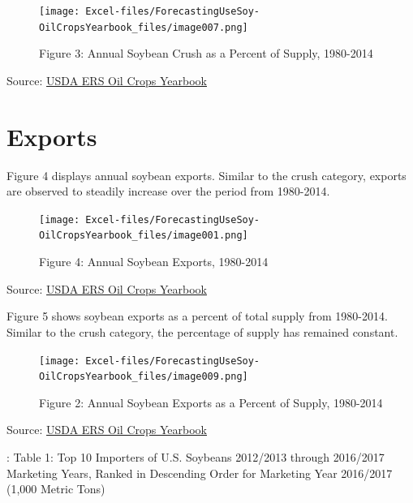 \documentclass[
]{book}
\begin{document}
\begin{figure}
\centering
\texttt{[image: Excel-files/ForecastingUseSoy-OilCropsYearbook\_files/image007.png]}
\caption{Figure 3: Annual Soybean Crush as a Percent of Supply, 1980-2014}
\end{figure}

Source: \href{http://www.ers.usda.gov/data-products/oil-crops-yearbook.aspx}{USDA ERS Oil Crops Yearbook}

\hypertarget{exports-2}{%
\section{Exports}\label{exports-2}}

Figure 4 displays annual soybean exports. Similar to the crush category, exports are observed to steadily increase over the period from 1980-2014.

\begin{figure}
\centering
\texttt{[image: Excel-files/ForecastingUseSoy-OilCropsYearbook\_files/image001.png]}
\caption{Figure 4: Annual Soybean Exports, 1980-2014}
\end{figure}

Source: \href{http://www.ers.usda.gov/data-products/oil-crops-yearbook.aspx}{USDA ERS Oil Crops Yearbook}

Figure 5 shows soybean exports as a percent of total supply from 1980-2014. Similar to the crush category, the percentage of supply has remained constant.

\begin{figure}
\centering
\texttt{[image: Excel-files/ForecastingUseSoy-OilCropsYearbook\_files/image009.png]}
\caption{Figure 2: Annual Soybean Exports as a Percent of Supply, 1980-2014}
\end{figure}

Source: \href{http://www.ers.usda.gov/data-products/oil-crops-yearbook.aspx}{USDA ERS Oil Crops Yearbook}

: Table 1: Top 10 Importers of U.S. Soybeans 2012/2013 through 2016/2017 Marketing Years, Ranked in Descending Order for Marketing Year 2016/2017 (1,000 Metric Tons)
\end{document}
